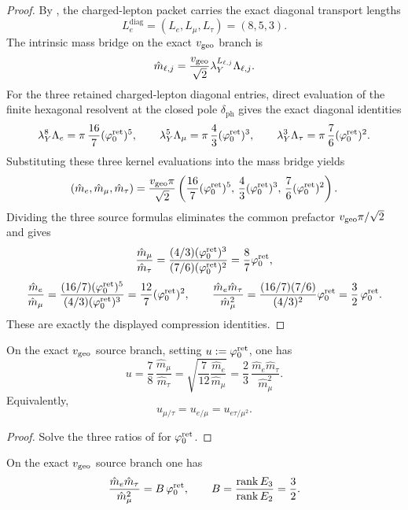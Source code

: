 \begin{proof}
By , the charged-lepton packet carries the exact diagonal
transport lengths
\[
L_e^{\mathrm{diag}}=(L_e,L_\mu,L_\tau)=(8,5,3).
\]
The intrinsic mass bridge on the exact $v_{\mathrm{geo}}$ branch is
\[
\hat m_{\ell,j}
=
\frac{v_{\mathrm{geo}}}{\sqrt2}\lambda_Y^{L_{\ell,j}}\Lambda_{\ell,j}.
\]
For the three retained charged-lepton diagonal entries, direct evaluation of the finite hexagonal
resolvent  at the closed pole $\delta_{\mathrm{ph}}$ gives the
exact diagonal identities
\[
\lambda_Y^{8}\Lambda_e
=
\pi\,\frac{16}{7}(\varphi_0^{\mathrm{ret}})^5,
\qquad
\lambda_Y^{5}\Lambda_\mu
=
\pi\,\frac{4}{3}(\varphi_0^{\mathrm{ret}})^3,
\qquad
\lambda_Y^{3}\Lambda_\tau
=
\pi\,\frac{7}{6}(\varphi_0^{\mathrm{ret}})^2.
\]
Substituting these three kernel evaluations into the mass bridge yields
\[
(\hat m_e,\hat m_\mu,\hat m_\tau)
=
\frac{v_{\mathrm{geo}}\pi}{\sqrt2}
\left(
\frac{16}{7}(\varphi_0^{\mathrm{ret}})^5,\,
\frac{4}{3}(\varphi_0^{\mathrm{ret}})^3,\,
\frac{7}{6}(\varphi_0^{\mathrm{ret}})^2
\right).
\]
Dividing the three source formulas eliminates the common prefactor $v_{\mathrm{geo}}\pi/\sqrt2$ and gives
\[
\frac{\hat m_\mu}{\hat m_\tau}
=
\frac{(4/3)(\varphi_0^{\mathrm{ret}})^3}{(7/6)(\varphi_0^{\mathrm{ret}})^2}
=
\frac{8}{7}\varphi_0^{\mathrm{ret}},
\]
\[
\frac{\hat m_e}{\hat m_\mu}
=
\frac{(16/7)(\varphi_0^{\mathrm{ret}})^5}{(4/3)(\varphi_0^{\mathrm{ret}})^3}
=
\frac{12}{7}(\varphi_0^{\mathrm{ret}})^2,
\qquad
\frac{\hat m_e \hat m_\tau}{\hat m_\mu^2}
=
\frac{(16/7)(7/6)}{(4/3)^2}\varphi_0^{\mathrm{ret}}
=
\frac32\,\varphi_0^{\mathrm{ret}}.
\]
These are exactly the displayed compression identities.
\end{proof}

\begin{corollary}
\label{cor:charged-lepton-seed-decoder}
On the exact $v_{\mathrm{geo}}$ source branch, setting $u:=\varphi_0^{\mathrm{ret}}$, one has
\[
u
=
\frac78\,\frac{\hat m_\mu}{\hat m_\tau}
=
\sqrt{\frac7{12}\frac{\hat m_e}{\hat m_\mu}}
=
\frac23\,\frac{\hat m_e\hat m_\tau}{\hat m_\mu^2}.
\]
Equivalently,
\[
u_{\mu/\tau}=u_{e/\mu}=u_{e\tau/\mu^2}.
\]
\end{corollary}

\begin{proof}
Solve the three ratios of  for $\varphi_0^{\mathrm{ret}}$.
\end{proof}

\begin{corollary}
\label{cor:carrier-asymmetry-leptons}
On the exact $v_{\mathrm{geo}}$ source branch one has
\[
\frac{\hat m_e \hat m_\tau}{\hat m_\mu^2}=B\,\varphi_0^{\mathrm{ret}},
\qquad
B=\frac{\operatorname{rank} E_3}{\operatorname{rank} E_2}=\frac32.
\]
\end{corollary}

